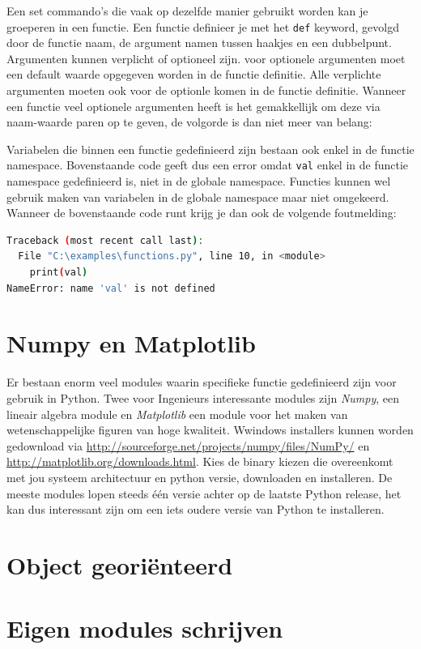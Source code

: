 \documentclass[11pt,twoside]{article}
\begin{document}
Een set commando's die vaak op dezelfde manier gebruikt worden kan je groeperen in een functie. Een functie definieer je met het \lstinline{def} keyword, gevolgd door de functie naam, de argument namen tussen haakjes en een dubbelpunt. Argumenten kunnen verplicht of optioneel zijn. voor optionele argumenten moet een default waarde opgegeven worden in de functie definitie. Alle verplichte argumenten moeten ook voor de optionle komen in de functie definitie. Wanneer een functie veel optionele argumenten heeft is het gemakkellijk om deze via naam-waarde paren op te geven, de volgorde is dan niet meer van belang:

Variabelen die binnen een functie gedefinieerd zijn bestaan ook enkel in de functie namespace. Bovenstaande code geeft dus een error omdat \lstinline{val} enkel in de functie namespace gedefinieerd is, niet in de globale namespace. Functies kunnen wel gebruik maken van variabelen in de globale namespace maar niet omgekeerd. Wanneer de bovenstaande code runt krijg je dan ook de volgende foutmelding:
\begin{lstlisting}[language=bash]
Traceback (most recent call last):
  File "C:\examples\functions.py", line 10, in <module>
    print(val)
NameError: name 'val' is not defined
\end{lstlisting}

	\section{Numpy en Matplotlib} 
Er bestaan enorm veel modules waarin specifieke functie gedefinieerd zijn voor gebruik in Python. Twee voor Ingenieurs interessante modules zijn \emph{Numpy}, een lineair algebra module en \emph{Matplotlib} een module voor het maken van wetenschappelijke figuren van hoge kwaliteit. Wwindows installers kunnen worden gedownload via \url{http://sourceforge.net/projects/numpy/files/NumPy/} en \url{http://matplotlib.org/downloads.html}. Kies de binary kiezen die overeenkomt met jou systeem architectuur en python versie, downloaden en installeren. De meeste modules lopen steeds één versie achter op de laatste Python release, het kan dus interessant zijn om een iets oudere versie van Python te installeren.

	\section{Object georiënteerd} 
	
 	\section{Eigen modules schrijven}
\end{document}
